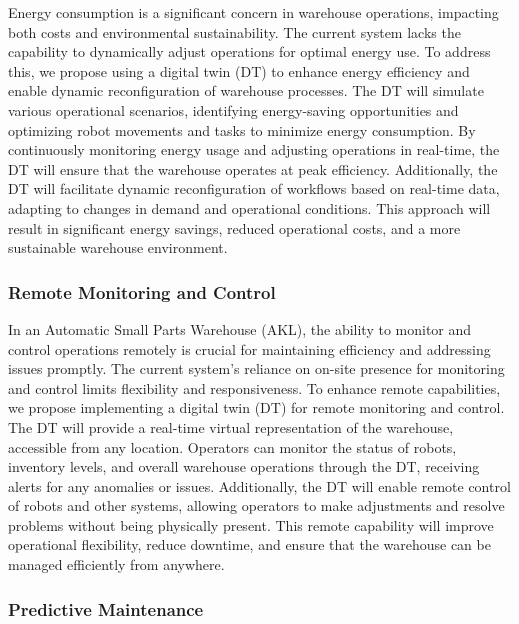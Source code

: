 Energy consumption is a significant concern in warehouse 
operations, impacting both costs and environmental sustainability. 
The current system lacks the capability to dynamically adjust 
operations for optimal energy use. To address this, we propose 
using a digital twin (DT) to enhance energy efficiency and 
enable dynamic reconfiguration of warehouse processes. 
The DT will simulate various operational scenarios, identifying 
energy-saving opportunities and optimizing robot movements and 
tasks to minimize energy consumption. By continuously monitoring 
energy usage and adjusting operations in real-time, the DT will 
ensure that the warehouse operates at peak efficiency. 
Additionally, the DT will facilitate dynamic reconfiguration of 
workflows based on real-time data, adapting to changes in demand 
and operational conditions. This approach will result in 
significant energy savings, reduced operational costs, and a 
more sustainable warehouse environment.

\subsubsection{Remote Monitoring and Control}

In an Automatic Small Parts Warehouse (AKL), 
the ability to monitor and control operations remotely is 
crucial for maintaining efficiency and addressing issues 
promptly. The current system's reliance on on-site presence 
for monitoring and control limits flexibility and 
responsiveness. To enhance remote capabilities, 
we propose implementing a digital twin (DT) for remote 
monitoring and control. The DT will provide a real-time 
virtual representation of the warehouse, 
accessible from any location. Operators can monitor the 
status of robots, inventory levels, and overall warehouse 
operations through the DT, receiving alerts for any anomalies 
or issues. Additionally, the DT will enable remote control of 
robots and other systems, allowing operators to make adjustments 
and resolve problems without being physically present. 
This remote capability will improve operational flexibility, 
reduce downtime, and ensure that the warehouse can be managed 
efficiently from anywhere.

\subsubsection{Predictive Maintenance}

